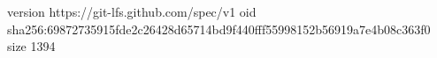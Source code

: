 version https://git-lfs.github.com/spec/v1
oid sha256:69872735915fde2c26428d65714bd9f440fff55998152b56919a7e4b08c363f0
size 1394
